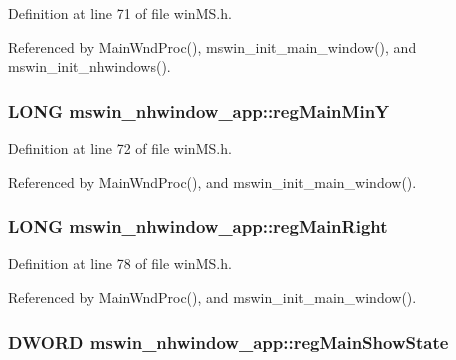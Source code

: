 Definition at line 71 of file win\+M\+S.\+h.



Referenced by Main\+Wnd\+Proc(), mswin\+\_\+init\+\_\+main\+\_\+window(), and mswin\+\_\+init\+\_\+nhwindows().

\hypertarget{structmswin__nhwindow__app_a4d5b28c825db1c51fee77ceabbac0bad}{
\subsubsection[{reg\+Main\+Min\+Y}]{\setlength{\rightskip}{0pt plus 5cm}L\+O\+N\+G mswin\+\_\+nhwindow\+\_\+app\+::reg\+Main\+Min\+Y}}\label{structmswin__nhwindow__app_a4d5b28c825db1c51fee77ceabbac0bad}


Definition at line 72 of file win\+M\+S.\+h.



Referenced by Main\+Wnd\+Proc(), and mswin\+\_\+init\+\_\+main\+\_\+window().

\hypertarget{structmswin__nhwindow__app_a9447cc1eb6b2e0586ec2b725614e277a}{
\subsubsection[{reg\+Main\+Right}]{\setlength{\rightskip}{0pt plus 5cm}L\+O\+N\+G mswin\+\_\+nhwindow\+\_\+app\+::reg\+Main\+Right}}\label{structmswin__nhwindow__app_a9447cc1eb6b2e0586ec2b725614e277a}


Definition at line 78 of file win\+M\+S.\+h.



Referenced by Main\+Wnd\+Proc(), and mswin\+\_\+init\+\_\+main\+\_\+window().

\hypertarget{structmswin__nhwindow__app_ae338ffa2fd42895c5a6800fd1ba8f5bd}{
\subsubsection[{reg\+Main\+Show\+State}]{\setlength{\rightskip}{0pt plus 5cm}D\+W\+O\+R\+D mswin\+\_\+nhwindow\+\_\+app\+::reg\+Main\+Show\+State}}\label{structmswin__nhwindow__app_ae338ffa2fd42895c5a6800fd1ba8f5bd}


